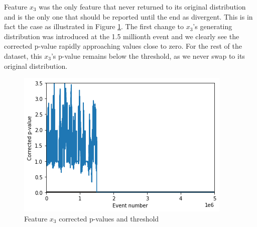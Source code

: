 Feature $x_3$ was the only feature that never returned to its original distribution and is the only one that should be reported until the end as divergent. This is in fact the case as illustrated in Figure \ref{fig:x3-corrected-pvalues}. The first change to $x_3$'s generating distribution was introduced at the 1.5 millionth event and we clearly see the corrected p-value rapidly approaching values close to zero. For the rest of the dataset, this $x_3$'s p-value remains below the threshold, as we never swap to its original distribution.
\begin{figure}[!htb]
    \begin{center}
      \includegraphics[scale=0.8]{figures/x3-corrected-pvalues.png}
      \caption{Feature $x_3$ corrected p-values and threshold}
      \label{fig:x3-corrected-pvalues}
    \end{center}
\end{figure}



